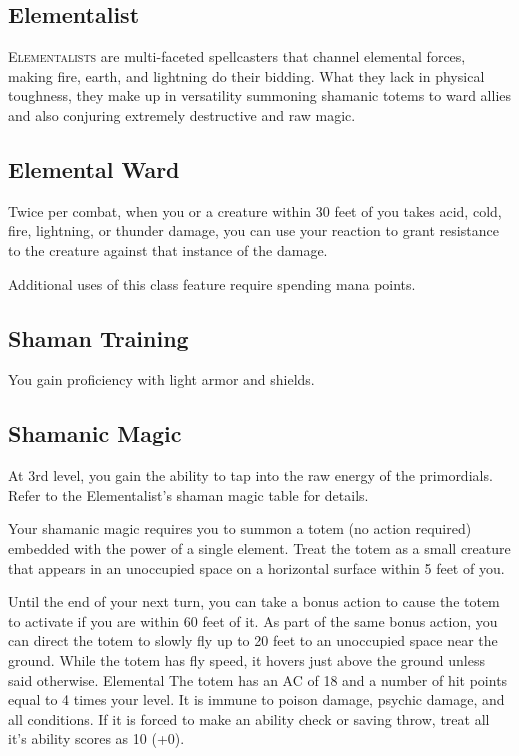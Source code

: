 
\begin{multicols*}{2}

\section{Elementalist}

\lettrine[lines=3, lhang=0.15, loversize=0.25, findent=.5em]{E}{lementalists} are multi-faceted spellcasters that channel elemental forces, making fire, earth, and lightning do their bidding. What they lack in physical toughness, they make up in versatility summoning shamanic totems to ward allies and also conjuring extremely destructive and raw magic.

\subsection*{Elemental Ward}

Twice per combat, when you or a creature within 30 feet of you takes acid, cold, fire, lightning, or thunder damage, you can use your reaction to grant resistance to the creature against that instance of the damage.

Additional uses of this class feature require spending mana points.

\subsection*{Shaman Training}

You gain proficiency with light armor and shields.

\subsection*{Shamanic Magic}

At 3rd level, you gain the ability to tap into the raw energy of the primordials. Refer to the Elementalist's shaman magic table for details.

Your shamanic magic requires you to summon a totem (no action required) embedded with the power of a single element. Treat the totem as a small creature that appears in an unoccupied space on a horizontal surface within 5 feet of you.

Until the end of your next turn, you can take a bonus action to cause the totem to activate if you are within 60 feet of it. As part of the same bonus action, you can direct the totem to slowly fly up to 20 feet to an unoccupied space near the ground. While the totem has fly speed, it hovers just above the ground unless said otherwise.
Elemental
The totem has an AC of 18 and a number of hit points equal to 4 times your level. It is immune to poison damage, psychic damage, and all conditions. If it is forced to make an ability check or saving throw, treat all it's ability scores as 10 (+0). 



\end{multicols*}
